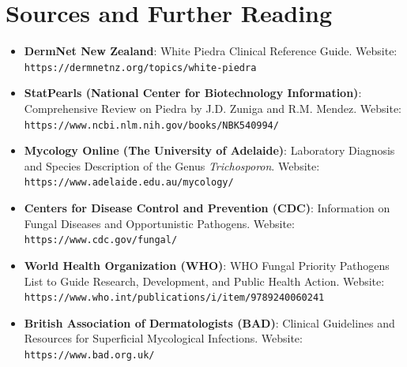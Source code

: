 \section*{Sources and Further Reading}
\begin{itemize}
    \item \textbf{DermNet New Zealand}: White Piedra Clinical Reference Guide. Website: \texttt{https://dermnetnz.org/topics/white-piedra}
    \item \textbf{StatPearls (National Center for Biotechnology Information)}: Comprehensive Review on Piedra by J.D. Zuniga and R.M. Mendez. Website: \texttt{https://www.ncbi.nlm.nih.gov/books/NBK540994/}
    \item \textbf{Mycology Online (The University of Adelaide)}: Laboratory Diagnosis and Species Description of the Genus \textit{Trichosporon}. Website: \texttt{https://www.adelaide.edu.au/mycology/}
    \item \textbf{Centers for Disease Control and Prevention (CDC)}: Information on Fungal Diseases and Opportunistic Pathogens. Website: \texttt{https://www.cdc.gov/fungal/}
    \item \textbf{World Health Organization (WHO)}: WHO Fungal Priority Pathogens List to Guide Research, Development, and Public Health Action. Website: \texttt{https://www.who.int/publications/i/item/9789240060241}
    \item \textbf{British Association of Dermatologists (BAD)}: Clinical Guidelines and Resources for Superficial Mycological Infections. Website: \texttt{https://www.bad.org.uk/}
\end{itemize}